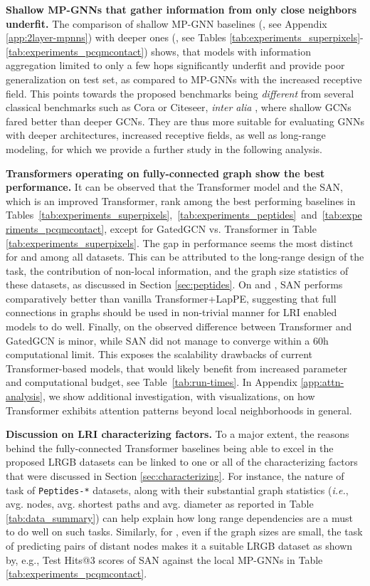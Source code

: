 \documentclass{article}
\begin{document}
\textbf{Shallow MP-GNNs that gather information from only close neighbors underfit.} The comparison of shallow MP-GNN baselines (, see Appendix \ref{app:2layer-mpnns}) with deeper ones (, see Tables \ref{tab:experiments_superpixels}-\ref{tab:experiments_pcqmcontact}) shows, that models with information aggregation limited to only a few hops significantly underfit and provide poor generalization on test set, as compared to MP-GNNs with the increased receptive field.
This points towards the proposed benchmarks being \textit{different} from several classical benchmarks such as Cora or Citeseer, \textit{inter alia} \cite{chen2020GCNII}, where shallow GCNs \cite{kipf2016gcn} fared better than deeper GCNs. They are thus more suitable for evaluating GNNs with deeper architectures, increased receptive fields, as well as long-range modeling, for which we provide a further study in the following analysis. 



\textbf{Transformers operating on fully-connected graph show the best performance.} It can be observed that the Transformer model and the SAN, which is an improved Transformer, rank among the best performing baselines in Tables~\ref{tab:experiments_superpixels},~\ref{tab:experiments_peptides}~and~\ref{tab:experiments_pcqmcontact}, except for GatedGCN vs. Transformer in Table \ref{tab:experiments_superpixels}. The gap in performance seems the most distinct for
\pepfunc and \pepstruct 
among all datasets. This can be attributed to the long-range design of the task, the contribution of non-local information, and the graph size statistics of these datasets, as discussed in Section \ref{sec:peptides}. On \pascal and \pcqmcontact, SAN performs comparatively better than vanilla Transformer+LapPE, suggesting that full connections in graphs should be used in non-trivial manner for LRI enabled models to do well. 
Finally, on \coco the observed difference between Transformer and GatedGCN is minor, while SAN did not manage to converge within a 60h computational limit. This exposes the scalability drawbacks of current Transformer-based models, that would likely benefit from increased parameter and computational budget, see Table~\ref{tab:run-times}. In Appendix \ref{app:attn-analysis}, we show additional investigation, with visualizations, on how Transformer exhibits attention patterns beyond local neighborhoods in general.

\textbf{Discussion on LRI characterizing factors.} 
To a major extent, the reasons behind the fully-connected Transformer baselines being able to excel in the proposed LRGB datasets can be linked to one or all of the characterizing factors that were discussed in Section \ref{sec:characterizing}. For instance, the nature of task of \texttt{Peptides-*} datasets, along with their substantial graph statistics (\textit{i.e.}, avg. nodes, avg. shortest paths and avg. diameter as reported in Table \ref{tab:data_summary}) can help explain how long range dependencies are a must to do well on such tasks. Similarly, for \pcqmcontact, even if the graph sizes are small, the task of predicting pairs of distant nodes makes it a suitable LRGB dataset as shown by, e.g., Test Hits@3 scores of SAN against the local MP-GNNs in Table \ref{tab:experiments_pcqmcontact}. 
\end{document}
